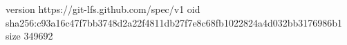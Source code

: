 version https://git-lfs.github.com/spec/v1
oid sha256:c93a16c47f7bb3748d2a22f4811db27f7e8c68fb1022824a4d032bb3176986b1
size 349692
